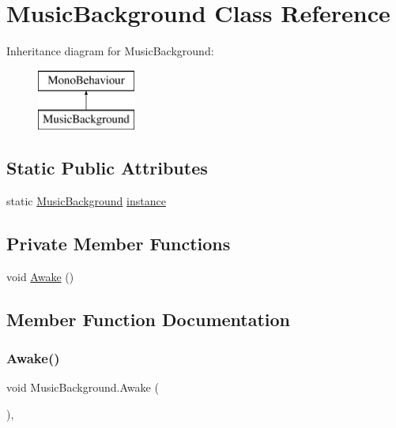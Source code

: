 \hypertarget{class_music_background}{}\section{Music\+Background Class Reference}
\label{class_music_background}
Inheritance diagram for Music\+Background\+:\begin{figure}[H]
\begin{center}
\leavevmode
\includegraphics[height=2.000000cm]{class_music_background}
\end{center}
\end{figure}
\subsection*{Static Public Attributes}
\begin{DoxyCompactItemize}
\item 
static \mbox{\hyperlink{class_music_background}{Music\+Background}} \mbox{\hyperlink{class_music_background_a8b829bcb5dbedc2263738689ffb80abc}{instance}}
\end{DoxyCompactItemize}
\subsection*{Private Member Functions}
\begin{DoxyCompactItemize}
\item 
void \mbox{\hyperlink{class_music_background_a6e3ecf4be42b6789e3237dca5c68f46f}{Awake}} ()
\end{DoxyCompactItemize}


\subsection{Member Function Documentation}
\mbox{\label{class_music_background_a6e3ecf4be42b6789e3237dca5c68f46f}} 
\subsubsection{\texorpdfstring{Awake()}{Awake()}}
{\footnotesize\ttfamily void Music\+Background.\+Awake (\begin{DoxyParamCaption}{ }\end{DoxyParamCaption})\hspace{0.3cm}{\ttfamily [inline]}, {\ttfamily [private]}}

